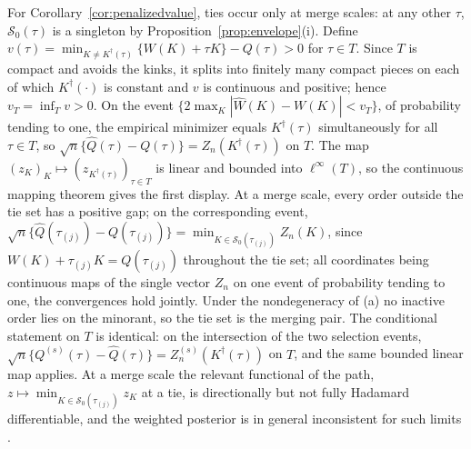\documentclass[11pt]{article}
\newcommand{\calS}{\mathcal S}
\begin{document}
For Corollary~\ref{cor:penalizedvalue}, ties occur only at merge scales: at any other $\tau$, $\calS_0(\tau)$ is a singleton by Proposition~\ref{prop:envelope}(i). Define $v(\tau)=\min_{K\ne K^\dagger(\tau)}\{W(K)+\tau K\}-Q(\tau)>0$ for $\tau\in T$. Since $T$ is compact and avoids the kinks, it splits into finitely many compact pieces on each of which $K^\dagger(\cdot)$ is constant and $v$ is continuous and positive; hence $v_T=\inf_Tv>0$. On the event $\{2\max_K|\widehat W(K)-W(K)|<v_T\}$, of probability tending to one, the empirical minimizer equals $K^\dagger(\tau)$ simultaneously for all $\tau\in T$, so $\sqrt n\{\widehat Q(\tau)-Q(\tau)\}=Z_n(K^\dagger(\tau))$ on $T$. The map $(z_K)_K\mapsto(z_{K^\dagger(\tau)})_{\tau\in T}$ is linear and bounded into $\ell^\infty(T)$, so the continuous mapping theorem gives the first display. At a merge scale, every order outside the tie set has a positive gap; on the corresponding event, $\sqrt n\{\widehat Q(\tau_{(j)})-Q(\tau_{(j)})\}=\min_{K\in\calS_0(\tau_{(j)})}Z_n(K)$, since $W(K)+\tau_{(j)}K=Q(\tau_{(j)})$ throughout the tie set; all coordinates being continuous maps of the single vector $Z_n$ on one event of probability tending to one, the convergences hold jointly. Under the nondegeneracy of (a) no inactive order lies on the minorant, so the tie set is the merging pair. The conditional statement on $T$ is identical: on the intersection of the two selection events, $\sqrt n\{Q^{(s)}(\tau)-\widehat Q(\tau)\}=Z^{(s)}_n(K^\dagger(\tau))$ on $T$, and the same bounded linear map applies. At a merge scale the relevant functional of the path, $z\mapsto\min_{K\in\calS_0(\tau_{(j)})}z_K$ at a tie, is directionally but not fully Hadamard differentiable, and the weighted posterior is in general inconsistent for such limits \citep{fang2019}.
\end{document}

